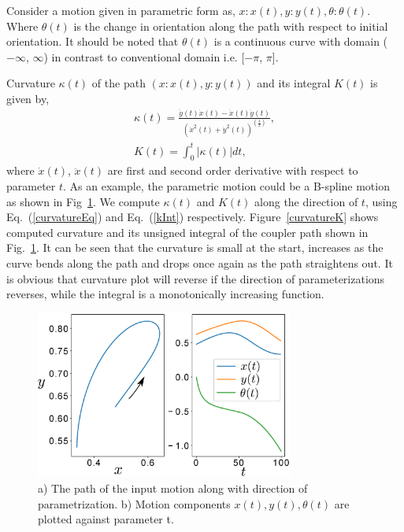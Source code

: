 \documentclass[twocolumn,10pt]{asme2ej}
\newcommand{\req}[1]{(\ref{#1})}
\begin{document}
Consider a motion given in parametric form as, $x:x(t), y:y(t), \theta:\theta(t)$.
Where $\theta(t)$ is the change in orientation along the path with respect to initial orientation.
It should be noted that $\theta(t)$ is a continuous curve with domain ($-\infty$, $\infty$) in contrast to conventional domain i.e. [$-\pi$, $\pi$].

Curvature $\kappa(t)$ of the path $(x:x(t), y:y(t))$ and its integral $K(t)$ is given by,
\begin{eqnarray}
  \kappa(t) = \frac{\ddot{y}(t)\dot{x}(t) - \ddot{x}(t)\dot{y}(t)}{{(\dot{x}^2(t) + \dot{y}^2(t))}^{(\frac 32)}}, \label{curvatureEq}\\
  K(t) = \int^{t}_0 |\kappa(t)|dt \label{kInt},
\end{eqnarray}
where $\dot{x}(t)$, $\ddot{x}(t)$ are first and second order derivative with respect to parameter $t$.
As an example, the parametric motion could be a B-spline motion as shown in Fig~\ref{bsplineFitting}.
We compute $\kappa(t)$ and $K(t)$ along the direction of $t$, using Eq.~\req{curvatureEq} and Eq.~\req{kInt} respectively.
Figure~\ref{curvatureK} shows computed curvature and its unsigned integral of the coupler path shown in Fig.~\ref{bsplineFitting}.
It can be seen that the curvature is small at the start, increases as the curve bends along the path and drops once again as the path straightens out. It is obvious that curvature plot will reverse if the direction of parameterizations reverses, while the integral is a monotonically increasing function.

\begin{figure}
\centering
\includegraphics[width=240pt]{figure/fig_bspline.eps}
  \caption{a) The path of the input motion along with direction of parametrization. b) Motion components $x(t), y(t), \theta(t)$ are plotted against parameter t.}
\label{bsplineFitting}
\end{figure}
\end{document}
